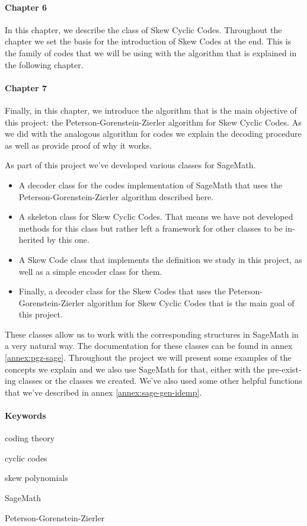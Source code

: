 \begin{otherlanguage}{english}
\paragraph{Chapter 6} In this chapter, we describe the class of Skew Cyclic Codes.
Throughout the chapter we set the basis for the introduction of Skew  Codes at the end.
This is the family of codes that we will be using with the algorithm that is explained in the following chapter.

\paragraph{Chapter 7} Finally, in this chapter, we introduce the algorithm that is the main objective of this project: the Peterson-Gorenstein-Zierler algorithm for Skew Cyclic Codes.
As we did with the analogous algorithm for  codes we explain the decoding procedure as well as provide proof of why it works.

As part of this project we've developed various classes for SageMath.
\begin{itemize}
  \item A decoder class for the  codes implementation of SageMath that uses the Peterson-Gorenstein-Zierler algorithm described here.
  \item A skeleton class for Skew Cyclic Codes. That means we have not developed methods for this class but rather left a framework for other classes to be inherited by this one.
  \item A Skew  Code class that implements the definition we study in this project, as well as a simple encoder class for them.
  \item Finally, a decoder class for the Skew  Codes that uses the Peterson-Gorenstein-Zierler algorithm for Skew Cyclic Codes that is the main goal of this project.
\end{itemize}

These classes allow us to work with the corresponding structures in SageMath in a very natural way.
The documentation for these classes can be found in annex \ref{annex:pgz-sage}.
Throughout the project we will present some examples of the concepts we explain and we also use SageMath for that, either with the pre-existing classes or the classes we created.
We've also used some other helpful functions that we've described in annex \ref{annex:sage-gen-idemp}.

\paragraph{Keywords}
\begin{itemize*}[label=,itemsep=4em,itemjoin=\hspace{2em}]
  \item coding theory
  \item cyclic codes 
  \item skew polynomials
  \item SageMath
  \item Peterson-Gorenstein-Zierler
\end{itemize*}

\end{otherlanguage}